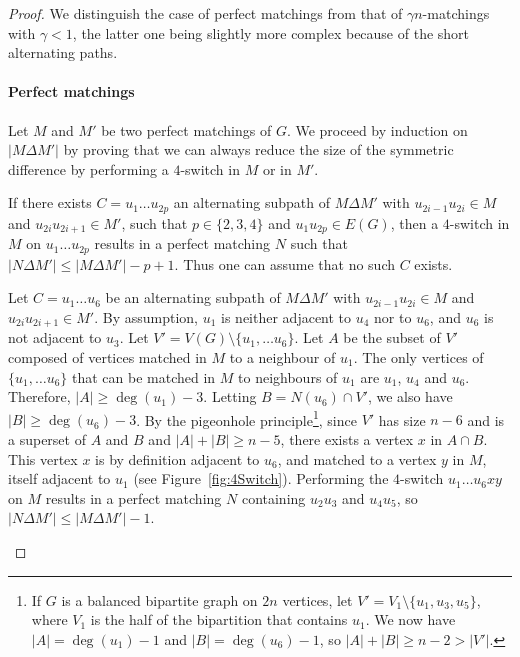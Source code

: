\documentclass[11pt,a4paper]{article}
\theoremstyle{definition}
\begin{document}
\begin{proof}
  We distinguish the case of perfect matchings from that of $\gamma n$-matchings with
  $\gamma<1$, the latter one being slightly more complex because of the short
  alternating paths. 
  \paragraph{Perfect matchings}
  Let $M$ and $M'$ be two perfect matchings of $G$. We proceed by induction on
  $|M \Delta M'|$  by proving that we can always reduce the size of the
  symmetric difference by performing a $4$-switch in $M$ or in $M'$.
  
  If there exists $C=u_1 \dots u_{2p}$ an alternating subpath of $M \Delta M'$ with
  $u_{2i-1}u_{2i} \in M$ and $u_{2i}u_{2i+1} \in M'$, such that
  $p \in \{2,3,4\}$ and $u_1u_{2p} \in E(G)$, then a $4$-switch in $M$ on
  $u_1\dots u_{2p}$ results in a perfect matching $N$ such that
  $|N \Delta M'|\le |M\Delta M'| - p + 1$. Thus one can assume that no such $C$
  exists.

  Let $C = u_1 \dots u_6$ be an alternating subpath of $M\Delta M'$ with
  $u_{2i-1}u_{2i} \in M$ and $u_{2i}u_{2i+1} \in M'$. By assumption, $u_1$ is
  neither adjacent to $u_4$ nor to $u_6$, and $u_6$ is not adjacent to
  $u_3$. Let $V' = V(G) \setminus\{u_1, \dots u_6\}$. Let $A$ be the subset of
  $V'$ composed of vertices matched in $M$ to a neighbour of $u_1$. The only
  vertices of $\{u_1, \dots u_6\}$ that can be matched in $M$ to neighbours of
  $u_1$ are $u_1$, $u_4$ and $u_6$. Therefore, $|A| \ge \deg(u_1)-3$. Letting
  $B = N(u_6) \cap V'$, we also have $|B| \ge \deg(u_6) -3$. By the pigeonhole
  principle\footnote{If $G$ is a balanced bipartite graph on $2n$ vertices, let
    $V' = V_1 \setminus \{u_1, u_3, u_5\}$, where $V_1$ is the half of the
    bipartition that contains $u_1$. We now have $|A| = \deg (u_1) -1$ and
    $|B| = \deg(u_6) -1$, so $|A| + |B| \ge n-2 > |V'|$.}, since $V'$ has size $n-6$
  and is a superset of $A$ and $B$ and $|A|+|B| \ge n-5$, there exists a vertex
  $x$ in $A\cap B$. This vertex $x$ is by definition adjacent to $u_6$, and
  matched to a vertex $y$ in $M$, itself adjacent to $u_1$ (see
  Figure~\ref{fig:4Switch}). Performing the $4$-switch $u_1 \dots u_6xy$ on $M$ results
  in a perfect matching $N$ containing $u_2u_3$ and $u_4u_5$, so
  $|N \Delta M'| \le |M\Delta M'| - 1$.
  \begin{figure}[ht!]
    \centering        
\end{figure}
\end{proof}
\end{document}
